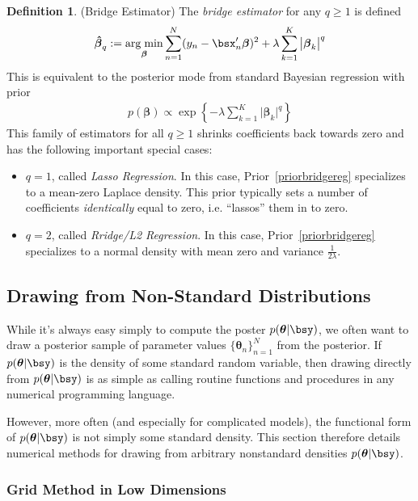 \documentclass[12pt]{article}
\theoremstyle{plain}
\theoremstyle{definition}
\newtheorem{defn}[thm]{Definition}
\theoremstyle{remark}
\newcommand{\bstheta}{\boldsymbol{\theta}}
\newcommand{\bsbeta}{\boldsymbol{\beta}}
\newcommand{\bshatbeta}{\boldsymbol{\hat{\beta}}}
\DeclareMathOperator*{\argmin}{arg\;min}
\newcommand{\sumnN}{\sum^N_{n=1}}
\newcommand{\nN}{_{n=1}^N}
\begin{document}
\begin{defn}(Bridge Estimator)
The \emph{bridge estimator} for any $q\geq 1$ is defined
\begin{align*}
  \bshatbeta_q
  :=
  \argmin_{\bsbeta}
  \sumnN
  (y_n-\bsx_n'\bsbeta)^2
  +
  \lambda
  \sum^K_{k=1} \big|\bsbeta_k\big|^q
\end{align*}
This is equivalent to the posterior mode from standard Bayesian
regression with prior
\begin{align}
   p(\bsbeta) \propto \exp\left\{
    -\lambda
    \sum^K_{k=1} \big|\bsbeta_k\big|^q
  \right\}
  \label{priorbridgereg}
\end{align}
This family of estimators for all $q\geq 1$ shrinks coefficients back
towards zero and has the following important special cases:
\begin{itemize}
  \item $q=1$, called \emph{Lasso Regression}.
    In this case, Prior~\ref{priorbridgereg} specializes to a mean-zero
    Laplace density.
    This prior typically sets a number of coefficients
    \emph{identically} equal to zero, i.e. ``lassos'' them in to zero.

  \item $q=2$, called \emph{Rridge/L2 Regression}. In this case,
    Prior~\ref{priorbridgereg} specializes to a normal density with mean
    zero and variance $\frac{1}{2\lambda}$.
\end{itemize}
\end{defn}


\clearpage
\subsection{Drawing from Non-Standard Distributions}

While it's always easy simply to compute the poster $p(\bstheta|\bsy)$,
we often want to draw a posterior sample of parameter values
$\{\bstheta_n\}\nN$ from the posterior.
If $p(\bstheta|\bsy)$ is the density of some standard random variable,
then drawing directly from $p(\bstheta|\bsy)$ is as simple as calling
routine functions and procedures in any numerical programming language.

However, more often (and especially for complicated models), the
functional form of $p(\bstheta|\bsy)$ is not simply some standard
density. This section therefore details numerical methods for drawing
from arbitrary nonstandard densities $p(\bstheta|\bsy)$.

\subsubsection{Grid Method in Low Dimensions}
\end{document}
